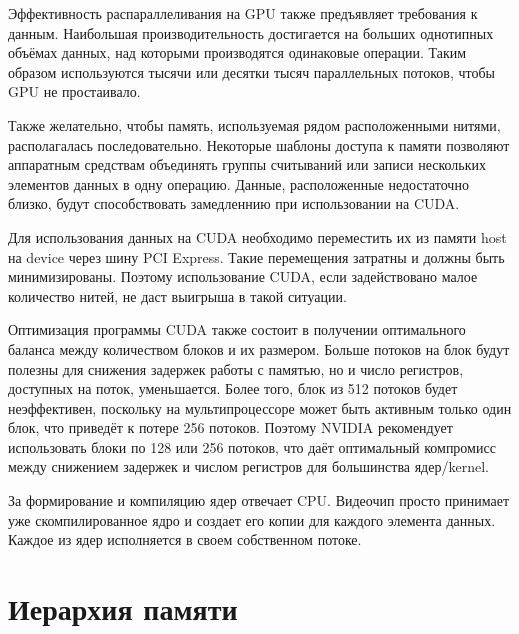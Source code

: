 \documentclass[a4paper,14pt,russian]{extreport}
\begin{document}
\par Эффективность распараллеливания на GPU также предъявляет требования к данным. Наибольшая производительность достигается на больших однотипных объёмах данных, над которыми производятся одинаковые операции. Таким образом используются тысячи или десятки тысяч параллельных потоков, чтобы GPU не простаивало. 
\par Также желательно, чтобы память, используемая рядом расположенными нитями, располагалась последовательно. Некоторые шаблоны доступа к памяти позволяют аппаратным средствам объединять группы считываний или записи нескольких элементов данных в одну операцию. Данные, расположенные недостаточно близко, будут способствовать замедленнию при использовании на CUDA.
\par Для использования данных на CUDA необходимо переместить их из памяти host на device через шину PCI Express. Такие перемещения затратны и должны быть минимизированы. Поэтому использование CUDA, если задействовано малое количество нитей, не даст выигрыша в такой ситуации.
\par Оптимизация программы CUDA также состоит в получении оптимального баланса между количеством блоков и их размером. Больше потоков на блок будут полезны для снижения задержек работы с памятью, но и число регистров, доступных на поток, уменьшается. Более того, блок из 512 потоков будет неэффективен, поскольку на мультипроцессоре может быть активным только один блок, что приведёт к потере 256 потоков. Поэтому NVIDIA рекомендует использовать блоки по 128 или 256 потоков, что даёт оптимальный компромисс между снижением задержек и числом регистров для большинства ядер/kernel.
\par За формирование и компиляцию ядер отвечает CPU. Видеочип просто
принимает уже скомпилированное ядро и создает его копии для каждого
элемента данных. Каждое из ядер исполняется в своем собственном потоке.


\section{Иерархия памяти}
\end{document}
